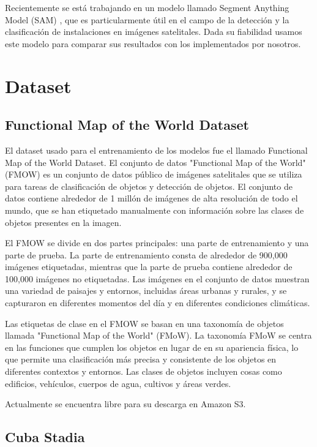 \documentclass[article]{llncs}
\begin{document}
Recientemente se está trabajando en un modelo llamado Segment Anything Model (SAM) \cite{SAM}, que es particularmente útil 
en el campo de la detección y la clasificación de instalaciones en imágenes satelitales. Dada su fiabilidad usamos 
este modelo para comparar sus resultados con los implementados por nosotros.


\section{Dataset}

\subsection{Functional Map of the World Dataset}

El dataset usado para el entrenamiento de los modelos fue el llamado Functional Map of the World Dataset. 
El conjunto de datos "Functional Map of the World" (FMOW) es un conjunto de datos público de imágenes satelitales 
que se utiliza para tareas de clasificación de objetos y detección de objetos. El conjunto de datos contiene alrededor 
de 1 millón de imágenes de alta resolución de todo el mundo, que se han etiquetado manualmente con información sobre 
las clases de objetos presentes en la imagen.

El FMOW se divide en dos partes principales: una parte de entrenamiento y una parte de prueba. La parte de entrenamiento 
consta de alrededor de 900,000 imágenes etiquetadas, mientras que la parte de prueba contiene alrededor de 100,000 
imágenes no etiquetadas. Las imágenes en el conjunto de datos muestran una variedad de paisajes y entornos, incluidas 
áreas urbanas y rurales, y se capturaron en diferentes momentos del día y en diferentes condiciones climáticas.

Las etiquetas de clase en el FMOW se basan en una taxonomía de objetos llamada "Functional Map of the World" (FMoW). La 
taxonomía FMoW se centra en las funciones que cumplen los objetos en lugar de en su apariencia física, lo que permite 
una clasificación más precisa y consistente de los objetos en diferentes contextos y entornos. Las clases de objetos 
incluyen cosas como edificios, vehículos, cuerpos de agua, cultivos y áreas verdes.

Actualmente se encuentra libre para su descarga en Amazon S3.

\subsection{Cuba Stadia}
\end{document}
